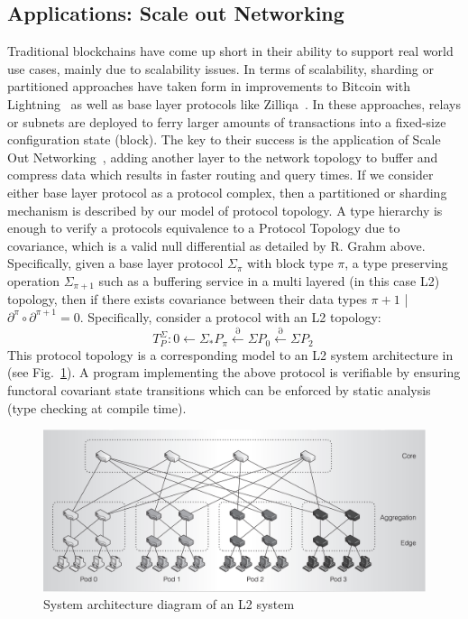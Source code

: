 \documentclass[runningheads]{llncs}
\begin{document}
\subsection{Applications: Scale out Networking}
Traditional blockchains have come up short in their ability to support real world use cases, mainly due to scalability issues. In terms of scalability, sharding or partitioned approaches have taken form in improvements to Bitcoin with Lightning~\cite{ref_url4} as well as base layer protocols like Zilliqa~\cite{ref_url5}. In these approaches, relays or subnets are deployed to ferry larger amounts of transactions into a fixed-size configuration state (block). The key to their success is the application of Scale Out Networking~\cite{ref_article11}, adding another layer to the network topology to buffer and compress data which results in faster routing and query times. If we consider either base layer protocol as a protocol complex, then a partitioned or sharding mechanism is described by our model of protocol topology. A type hierarchy is enough to verify a protocols equivalence to a Protocol Topology due to covariance, which is a valid null differential as detailed by R. Grahm above. Specifically, given a base layer protocol $\Sigma_\pi$ with block type $\pi$, a type preserving operation $\Sigma_{\pi+1}$ such as a buffering service in a multi layered (in this case L2) topology, then if there exists covariance between their data types $\pi+1$ | $\partial^\pi \circ \partial^{\pi+1} = 0$. Specifically, consider a protocol with an L2 topology:
\begin{equation}
T^{\Sigma}_P: 0 \leftarrow \Sigma_{*}P_\pi \xleftarrow{\partial} \Sigma P_{0} \xleftarrow{\partial} \Sigma P_2 \ 
\end{equation}
This protocol topology is a corresponding model to an L2 system architecture in (see Fig.~\ref{fig1}). A program implementing the above protocol is verifiable by ensuring functoral covariant state transitions which can be enforced by static analysis~\cite{ref_article10} (type checking at compile time).
\begin{figure}
\includegraphics[width=\textwidth]{l2-system-architecture.png}
\caption{System architecture diagram of an L2 system ~\cite{ref_article11}} \label{fig1}
\end{figure}
\end{document}
